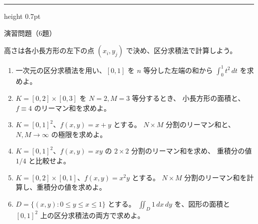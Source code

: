 \documentclass[a4paper,10pt,pdflatex,ja=standard,jafont=ipaex-type1,
  magstyle=real,scale=1]{bxjsarticle}
\newcommand{\topic}[1]{\par\vspace{5pt}%
  {\large\sffamily\mdseries\color{accent}#1}\par\vspace{2pt}}
\newenvironment{problems}
  {\begin{enumerate}[leftmargin=2em,itemsep=3pt,topsep=3pt,parsep=0pt,
    font=\color{accent}]}
  {\end{enumerate}}
\newcommand{\problemspace}{\par\vspace{5mm}}
\newcommand{\exercises}{%
  {\color{accent}\hrule height 0.7pt}\vspace{3pt}%
  \topic{演習問題（6題）}%
  {\small 高さは各小長方形の左下の点 $(x_i,y_j)$ で決め、区分求積法で計算しよう。}\par}
\begin{document}
\noindent\begin{minipage}[b][0.5\textheight][t]{\linewidth}
\exercises
\begin{problems}
\item 一次元の区分求積法を用い、$[0,1]$ を $n$ 等分した左端の和から
$\displaystyle\int_0^1 t^2\,dt$ を求めよ。\problemspace

\item $K=[0,2]\times[0,3]$ を $N=2,M=3$ 等分するとき、
小長方形の面積と、$f\equiv4$ のリーマン和を求めよ。\problemspace

\item $K=[0,1]^2$、$f(x,y)=x+y$ とする。
$N\times M$ 分割のリーマン和と、$N,M\to\infty$ の極限を求めよ。\problemspace

\item $K=[0,1]^2$、$f(x,y)=xy$ の $2\times2$ 分割のリーマン和を求め、
重積分の値 $1/4$ と比較せよ。\problemspace

\item $K=[0,2]\times[0,1]$、$f(x,y)=x^2y$ とする。
$N\times M$ 分割のリーマン和を計算し、重積分の値を求めよ。\problemspace


\item $D=\{(x,y):0\le y\le x\le1\}$ とする。
$\iint_D1\,dx\,dy$ を、図形の面積と $[0,1]^2$ 上の区分求積法の両方で求めよ。\problemspace

\end{problems}
\end{minipage}
\end{document}
